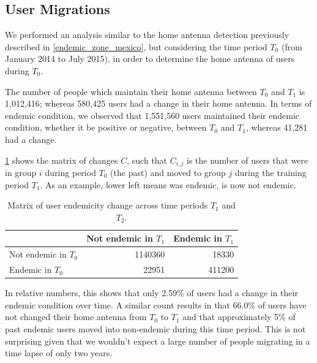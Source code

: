 


\subsection{User Migrations}\label{subsection:user_migrations} %

We performed an analysis similar to the home antenna detection previously described in \cref{endemic_zone_mexico}, but considering the time period $T_0$ (from January 2014 to July 2015), in order to determine the home antenna of users during $T_0$.

The number of people which maintain their home antenna between $T_0$ and $T_1$ is 1,012,416; whereas 580,425 users had a change in their home antenna.
In terms of endemic condition, we observed that 1,551,560 users maintained their endemic condition, whether it be positive or negative, between $T_0$ and $T_1$, whereas 41,281 had a change.


\cref{tab:changes} shows the matrix of changes $C$, such that $C_{i, j}$ is the number of users that were in group $i$ during period $T_0$ (the past) and moved to group $j$ during the training period $T_1$.
As an example, lower left means was endemic, is now not endemic.

\begin{table}[ht]
	\caption{Matrix of user endemicity change across time periods $T_1$ and $T_2$.}\label{tab:changes}
	\centering
	\begin{tabular}{l r r }
		\toprule
		& Not endemic in $T_1$ & Endemic in $T_1$ \\
		\midrule
		Not endemic in $T_0$ & 1140360 & 18330   \\
		Endemic in $T_0$       & 22951    & 411200 \\
		\bottomrule
	\end{tabular}
\end{table}

In relative numbers, this shows that only 2.59\% of users had a change in their endemic condition over time.
A similar count results in that 66.0\% of users have not changed their home antenna from $T_0$ to $T_1$ and that approximately 5\% of past endemic users moved into non-endemic during this time period.
This is not surprising given that we wouldn't expect a large number of people migrating in a time lapse of only two years.


